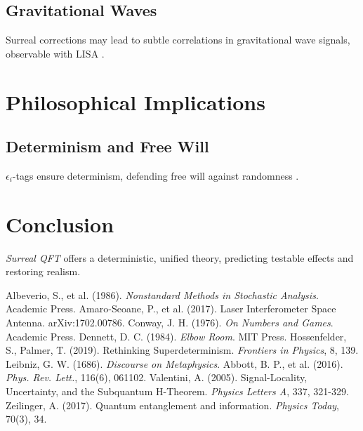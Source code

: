 \documentclass{article}
\begin{document}
\subsection{Gravitational Waves}
Surreal corrections may lead to subtle correlations in gravitational wave signals, observable with LISA \cite{Amaro-Seoane2017}.

\section{Philosophical Implications}
\subsection{Determinism and Free Will}
\(\epsilon_i\)-tags ensure determinism, defending free will against randomness \cite{Leibniz1686, Dennett1984}.

\section{Conclusion}
\textit{Surreal QFT} offers a deterministic, unified theory, predicting testable effects and restoring realism.

\begin{thebibliography}{9}
 Albeverio, S., et al. (1986). \emph{Nonstandard Methods in Stochastic Analysis}. Academic Press.
 Amaro-Seoane, P., et al. (2017). Laser Interferometer Space Antenna. arXiv:1702.00786.
 Conway, J. H. (1976). \emph{On Numbers and Games}. Academic Press.
 Dennett, D. C. (1984). \emph{Elbow Room}. MIT Press.
 Hossenfelder, S., Palmer, T. (2019). Rethinking Superdeterminism. \emph{Frontiers in Physics}, 8, 139.
 Leibniz, G. W. (1686). \emph{Discourse on Metaphysics}.
 Abbott, B. P., et al. (2016). \emph{Phys. Rev. Lett.}, 116(6), 061102.
 Valentini, A. (2005). Signal-Locality, Uncertainty, and the Subquantum H-Theorem. \emph{Physics Letters A}, 337, 321-329.
 Zeilinger, A. (2017). Quantum entanglement and information. \emph{Physics Today}, 70(3), 34.
\end{thebibliography}
\end{document}
